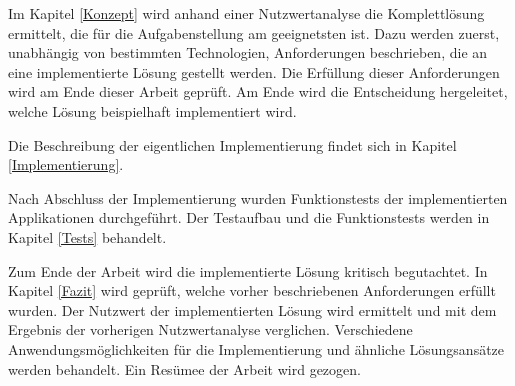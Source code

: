 Im Kapitel \ref{Konzept} wird anhand einer Nutzwertanalyse die Komplettlösung ermittelt, die für die Aufgabenstellung am geeignetsten ist.  Dazu werden zuerst, unabhängig von bestimmten Technologien, Anforderungen beschrieben, die an eine implementierte Lösung gestellt werden. Die Erfüllung dieser Anforderungen wird am Ende dieser Arbeit geprüft.  Am Ende wird die Entscheidung hergeleitet, welche Lösung beispielhaft implementiert wird.

Die Beschreibung der eigentlichen Implementierung findet sich in Kapitel \ref{Implementierung}.

Nach Abschluss der Implementierung wurden Funktionstests der implementierten Applikationen durchgeführt. Der Testaufbau und die Funktionstests werden in Kapitel \ref{Tests} behandelt.

Zum Ende der Arbeit wird die implementierte Lösung kritisch begutachtet. In Kapitel \ref{Fazit} wird geprüft, welche vorher beschriebenen Anforderungen erfüllt wurden. Der Nutzwert der implementierten Lösung wird ermittelt und mit dem Ergebnis der vorherigen Nutzwertanalyse verglichen. Verschiedene Anwendungsmöglichkeiten für die Implementierung und ähnliche Lösungsansätze werden behandelt. Ein Resümee der Arbeit wird gezogen.





